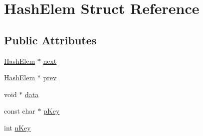 \hypertarget{struct_hash_elem}{\section{Hash\-Elem Struct Reference}
\label{struct_hash_elem}
}
\subsection*{Public Attributes}
\begin{DoxyCompactItemize}
\item 
\hyperlink{struct_hash_elem}{Hash\-Elem} $\ast$ \hyperlink{struct_hash_elem_a2d28fad45ff21ffb8a02a7133df860fd}{next}
\item 
\hyperlink{struct_hash_elem}{Hash\-Elem} $\ast$ \hyperlink{struct_hash_elem_ae4d011c0dc807a3c100ccdb927dd0ba9}{prev}
\item 
void $\ast$ \hyperlink{struct_hash_elem_ac7e80f63ba2f82457ff68aa0cd360365}{data}
\item 
const char $\ast$ \hyperlink{struct_hash_elem_a9c33a7c8ac467a5547a123338daf61f4}{p\-Key}
\item 
int \hyperlink{struct_hash_elem_a12c1252e6aa2958f73e2ef969c9a3d81}{n\-Key}
\end{DoxyCompactItemize}



